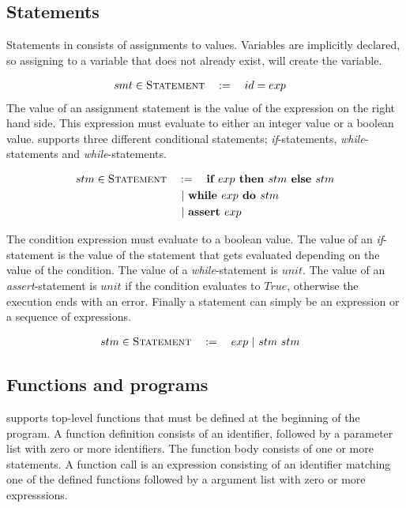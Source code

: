 \subsection{Statements}
Statements in \explanguage consists of assignments to values. Variables are implicitly declared, so assigning to a variable that does not already exist, will create the variable. 

\begin{alignat*}{3}
	smt & \in \textsc{Statement} && := \quad id  = exp 
\end{alignat*} 
The value of an assignment statement is the value of the expression on the right hand side. This expression must evaluate to either an integer value or a boolean value. \explanguage supports three different conditional statements;  \textsl{if}-statements, \textsl{while}-statements and \textsl{while}-statements. 

\begin{alignat*}{3}
	stm & \in \textsc{Statement} && := \quad \textbf{if }  exp \textbf{ then } stm \textbf{ else } stm\\
	& && \ | \  \textbf{while } exp \textbf{ do } stm\\
	& && \ | \  \textbf{assert } exp
\end{alignat*}

The condition expression must evaluate to a boolean value. The value of an \textsl{if}-statement is the value of the statement that gets evaluated depending on the value of the condition. The value of a \textsl{while}-statement is $unit$. The value of an \textsl{assert}-statement is $unit$ if the condition evaluates to $True$, otherwise the execution ends with an error. Finally a statement can simply be an expression or a sequence of expressions. 

\begin{alignat*}{3}
	stm & \in \textsc{Statement} && := \quad exp \alt stm \ stm
\end{alignat*}


\subsection{Functions and programs}
\explanguage supports top-level functions that must be defined at the beginning of the program. A function definition consists of an identifier, followed by a parameter list with zero or more identifiers. The function body consists of one or more statements. A function call is an expression consisting of an identifier matching one of the defined functions followed by a argument list with zero or more expresssions. 

